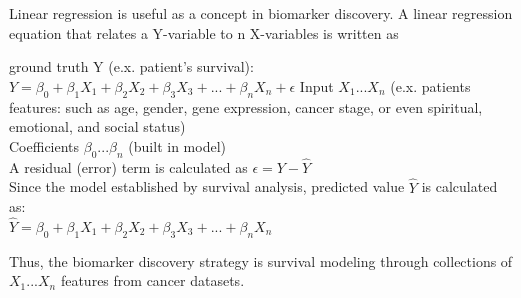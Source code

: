 \documentclass[jpm,article,submit,moreauthors,pdftex]{Definitions/mdpi}
\begin{document}
Linear regression is useful as a concept in biomarker discovery.
A linear regression equation that relates a Y-variable to n X-variables is written as\\[1cm]
\begin{flushleft}

ground truth Y (e.x. patient's survival):\\[0.5cm]
$Y = \beta_0 + \beta_1 X_1 + \beta_2 X_2 + \beta_3 X_3 + ... + \beta_n X_n + \epsilon$
\linebreak
\linebreak
Input $X_1...X_n$ (e.x. patients features: such as age, gender, gene expression, cancer stage, or even spiritual, emotional, and social status)
\\[0.5cm]
Coefficients $\beta_0...\beta_n$ (built in model)\\[0.5cm]
A residual (error) term is calculated as $\epsilon=Y - \hat Y$\\
Since the model established by survival analysis, predicted value $\hat Y$ is calculated as:\\[0.3cm]
$\hat Y = \beta_0 + \beta_1 X_1 + \beta_2 X_2 + \beta_3 X_3 + ... + \beta_n X_n$
\linebreak
\end{flushleft}
Thus, the biomarker discovery strategy is survival modeling through collections of $X_1...X_n$ features from cancer datasets.\\[1cm]
\end{document}
